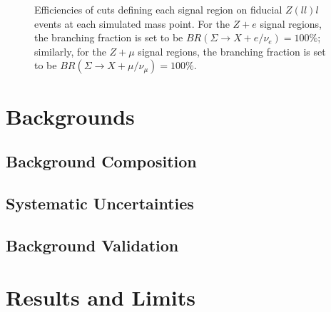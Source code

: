 \begin{figure}[htb]
{	}
	\caption{Efficiencies of cuts defining each signal region on fiducial $Z(ll)l$ events at each simulated mass point. For the $Z+e$ signal regions, the branching fraction is set to be $BR(\Sigma\rightarrow X+e/\nu_{e})=100\%$; similarly, for the $Z+\mu$ signal regions, the branching fraction is set to be $BR(\Sigma\rightarrow X+\mu/\nu_{\mu})=100\%$.}
	\label{fig:fiducial-efficiencies-vs-mass}
\end{figure}

\section{Backgrounds}
\subsection{Background Composition}

\subsection{Systematic Uncertainties}

\subsection{Background Validation}


\section{Results and Limits}